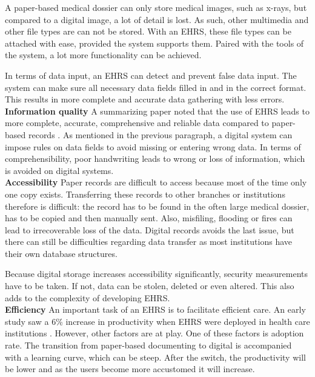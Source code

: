         A paper-based medical dossier can only store medical images, such as x-rays, but compared to a digital image, a lot of detail is lost. As such, other multimedia and other file types are can not be stored. With an EHRS, these file types can be attached with ease, provided the system supports them. Paired with the tools of the system, a lot more functionality can be achieved.

        In terms of data input, an EHRS can detect and prevent false data input. The system can make sure all necessary data fields filled in and in the correct format. This results in more complete and accurate data gathering with less errors.\\

        \noindent\textbf{Information quality} A summarizing paper noted that the use of EHRS leads to more complete, accurate, comprehensive and reliable data compared to paper-based records \cite{ehrs_summary}. As mentioned in the previous paragraph, a digital system can impose rules on data fields to avoid missing or entering wrong data. In terms of comprehensibility, poor handwriting leads to wrong or loss of information, which is avoided on digital systems.\\

        \noindent\textbf{Accessibility} Paper records are difficult to access because most of the time only one copy exists. Transferring these records to other branches or institutions therefore is difficult: the record has to be found in the often large medical dossier, has to be copied and then manually sent. Also, misfiling, flooding or fires can lead to irrecoverable loss of the data. Digital records avoids the last issue, but there can still be difficulties regarding data transfer as most institutions have their own database structures.

        Because digital storage increases accessibility significantly, security measurements have to be taken. If not, data can be stolen, deleted or even altered. This also adds to the complexity of developing EHRS.\\

        \noindent\textbf{Efficiency} An important task of an EHRS is to facilitate efficient care. An early study saw a 6\% increase in productivity when EHRS were deployed in health care institutions \cite{ehrs_efficiency}. However, other factors are at play. One of these factors is adoption rate. The transition from paper-based documenting to digital is accompanied with a learning curve, which can be steep. After the switch, the productivity will be lower and as the users become more accustomed it will increase.

